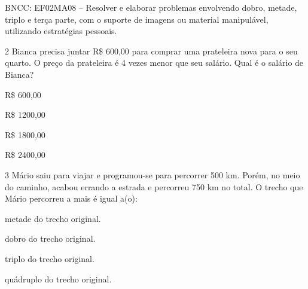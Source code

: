 \begin{escolha}
\begin{escolha}
{BNCC: EF02MA08 -- Resolver e elaborar problemas envolvendo dobro, metade, triplo e terça parte,
com o suporte de imagens ou material manipulável, utilizando estratégias
pessoais.}

\num{2} Bianca precisa juntar R\$ 600,00 para comprar uma prateleira nova para o
seu quarto. O preço da prateleira é 4 vezes menor que seu salário. Qual
é o salário de Bianca?

\begin{minipage}{.5\textwidth}
\begin{escolha}
\item R\$ 600,00

\item R\$ 1200,00

\item R\$ 1800,00

\item R\$ 2400,00
\end{escolha}
\end{minipage}

\num{3} Mário saiu para viajar e programou-se para percorrer 500 km. Porém, no
meio do caminho, acabou errando a estrada e percorreu 750 km no total. O
trecho que Mário percorreu a mais é igual a(o):

\begin{escolha}
\item metade do trecho original.

\item dobro do trecho original.

\item triplo do trecho original.

\item quádruplo do trecho original.
\end{escolha}



\end{escolha}
\end{escolha}
